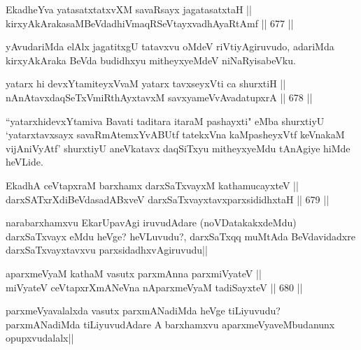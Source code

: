 \begin{shl}
EkadheYva yatasatxtatxvXM savaRsayx jagatasatxtaH || \\
kirxyAkArakasaMBeVdadhiVmaqRSeVtayxvadhAyaRtAmf ||  677 ||  
\end{shl}

\begin{artha} 
yAvudariMda elAlx jagatitxgU tatavxvu oMdeV riVtiyAgiruvudo, adariMda 
kirxyAkAraka BeVda budidhxyu mitheyxyeMdeV niNaRyisabeVku.
\end{artha}


\begin{shl}
yatarx hi devxYtamiteyxVvaM yatarx tavxseyxVti ca shurxtiH || \\
nAnAtavxdaqSeTxVmiRthAyxtavxM savxyameVvAvadatupxrA ||  678 ||  
\end{shl}

\begin{artha} 
``yatarxhidevxYtamiva Bavati taditara itaraM pashayxti" eMba shurxtiyU `yatarxtavxsayx savaRmAtemxYvABUtf tatekxVna kaMpasheyxVtf keVnakaM vijAniVyAtf' shurxtiyU aneVkatavx daqSiTxyu mitheyxyeMdu tAnAgiye hiMde heVLide.
\end{artha}


\begin{shl}
EkadhA ceVtapxraM barxhamx darxSaTxvayxM kathamucayxteV || \\
darxSATxrXdiBeVdasadABxveV darxSaTxvayxtavxparxsididhxtaH ||  679 ||  
\end{shl}

\begin{artha} 
narabarxhamxvu EkarUpavAgi iruvudAdare (noVDatakakxdeMdu) darxSaTxvayx 
eMdu heVge? heVLuvudu?, darxSaTxqq muMtAda BeVdavidadxre 
darxSaTxvayxtavxvu parxsidadhxvAgiruvudu||
\end{artha}


\begin{shl}
aparxmeVyaM kathaM vasutx parxmAnna parxmiVyateV || \\
miVyateV ceVtapxrXmANeVna nAparxmeVyaM tadiSayxteV ||  680 ||  
\end{shl}

\begin{artha} 
parxmeVyavalalxda vasutx parxmANadiMda heVge tiLiyuvudu? parxmANadiMda 
tiLiyuvudAdare A barxhamxvu aparxmeVyaveMbudanunx opupxvudalalx||
\end{artha}

